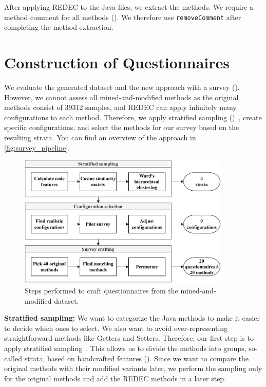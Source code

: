 \documentclass[%
class=scrreprt,
chapterprefix=false,%
open=right,%
twoside=true,%
paper=a4,%
logofile={Logo\_zentral\_farbig\_EN.png},%
thesistype=master,%
UKenglish,%
]{se2thesis}
\theoremstyle{definition}
\newcommand{\numOriginal}{39312\xspace}
\newcommand{\rdh}{REDEC\xspace}
\begin{document}
	After applying \rdh to the Java files, we extract the methods. We require a method comment for all methods (). We therefore use \texttt{removeComment} after completing the method extraction.
	
\section{Construction of Questionnaires} \label{Construction of Questionnaires}
	We evaluate the generated dataset and the new approach with a survey (). However, we cannot assess all mined-and-modified methods as the original methods consist of \numOriginal samples, and \rdh can apply infinitely many configurations to each method.
	Therefore, we apply stratified sampling ()~\cite{thompson2012sampling}, create specific configurations, and select the methods for our survey based on the resulting strata. You can find an overview of the approach in \autoref{fig:survey_pipeline}.
	
	\begin{figure}[tb]
		\centering
		\includegraphics[width=0.9\textwidth]{img/survey_pipeline.pdf}
		\caption{Steps performed to craft questionnaires from the mined-and-modified dataset.}
		\label{fig:survey_pipeline}
	\end{figure}
	
	\textbf{Stratified sampling:} 
	We want to categorize the Java methods to make it easier to decide which ones to select. We also want to avoid over-representing straightforward methods like Getters and Setters. Therefore, our first step is to apply stratified sampling~\cite{thompson2012sampling}. This allows us to divide the methods into groups, so-called strata, based on handcrafted features ().
    Since we want to compare the original methods with their modified variants later, we perform the sampling only for the original methods and add the \rdh methods in a later step.
\end{document}
